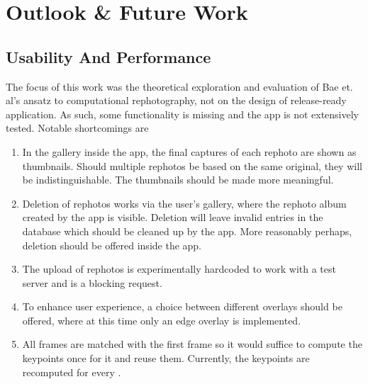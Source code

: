 \chapter{Outlook \& Future Work}\label{ch:outlook}

\section{Usability And Performance}

The focus of this work was the theoretical exploration and evaluation of Bae et.
al's ansatz to computational rephotography, not on the design of release-ready
application. As such, some functionality is missing and the app is not
extensively tested. Notable shortcomings are
\begin{enumerate}
   \item In the gallery inside the app, the final captures of each rephoto are
      shown as thumbnails. Should multiple rephotos be based on the same
      original, they will be indistinguishable. The thumbnails should be made
      more meaningful.

   \item Deletion of rephotos works via the user's gallery, where the rephoto
      album created by the app is visible. Deletion will leave invalid entries
      in the database which should be cleaned up by the app. More reasonably
      perhaps, deletion should be offered inside the app.


   \item The upload of rephotos is experimentally hardcoded to work with a test
      server and is a blocking request.

   \item To enhance user experience, a choice between different overlays should
      be offered, where at this time only an edge overlay is implemented.

   \item All frames are matched with the first frame so it would suffice to
      compute the keypoints once for it and reuse them. Currently, the keypoints
      are recomputed for every .


\end{enumerate}
